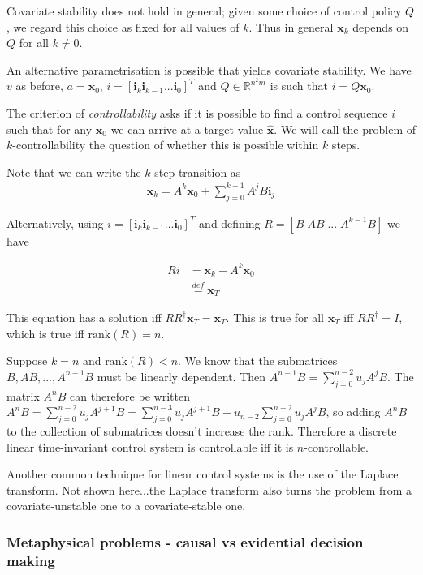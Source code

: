 Covariate stability does not hold in general; given some choice of control policy $Q$, we regard this choice as fixed for all values of $k$. Thus in general $\mathbf{x}_k$ depends on $Q$ for all $k\neq 0$.

An alternative parametrisation is possible that yields covariate stability. We have $v$ as before, $a=\mathbf{x}_0$, $i=[\mathbf{i}_k \mathbf{i}_{k-1} ... \mathbf{i}_0]^T$ and $Q\in \mathbb{R}^{n^2m}$ is such that $i = Q \mathbf{x}_0$.

The criterion of \emph{controllability} asks if it is possible to find a control sequence $i$ such that for any $\mathbf{x}_0$ we can arrive at a target value $\hat{\mathbf{x}}$. We will call the problem of $k$-controllability the question of whether this is possible within $k$ steps.

Note that we can write the $k$-step transition as
\begin{align}
    \mathbf{x}_k = A^k \mathbf{x}_0 + \sum_{j=0}^{k-1} A^j B \mathbf{i}_j
\end{align}

Alternatively, using $i=[\mathbf{i}_k \mathbf{i}_{k-1} ... \mathbf{i}_0]^T$ and defining $R=[B\;AB\; ...\;A^{k-1}B]$ we have

\begin{align}
    Ri &= \mathbf{x}_k - A^k \mathbf{x}_0 \\
       &\overset{def}{=} \mathbf{x}_T
\end{align}

This equation has a solution iff $RR^\dagger \mathbf{x}_T = \mathbf{x}_T$. This is true for all $\mathbf{x}_T$ iff $RR^\dagger = I$, which is true iff $\text{rank}(R)=n$.

Suppose $k=n$ and $\text{rank}(R) < n$. We know that the submatrices $B, AB, ...,A^{n-1}B$ must be linearly dependent. Then $A^{n-1}B = \sum_{j=0}^{n-2} u_j A^j B$. The matrix $A^n B$ can therefore be written $A^n B = \sum_{j=0}^{n-2} u_j A^{j+1} B= \sum_{j=0}^{n-3} u_j A^{j+1} B + u_{n-2} \sum_{j=0}^{n-2} u_j A^j B$, so adding $A^n B$ to the collection of submatrices doesn't increase the rank. Therefore a discrete linear time-invariant control system is controllable iff it is $n$-controllable.

Another common technique for linear control systems is the use of the Laplace transform. Not shown here...the Laplace transform also turns the problem from a covariate-unstable one to a covariate-stable one.

\subsubsection{Metaphysical problems - causal vs evidential decision making}

